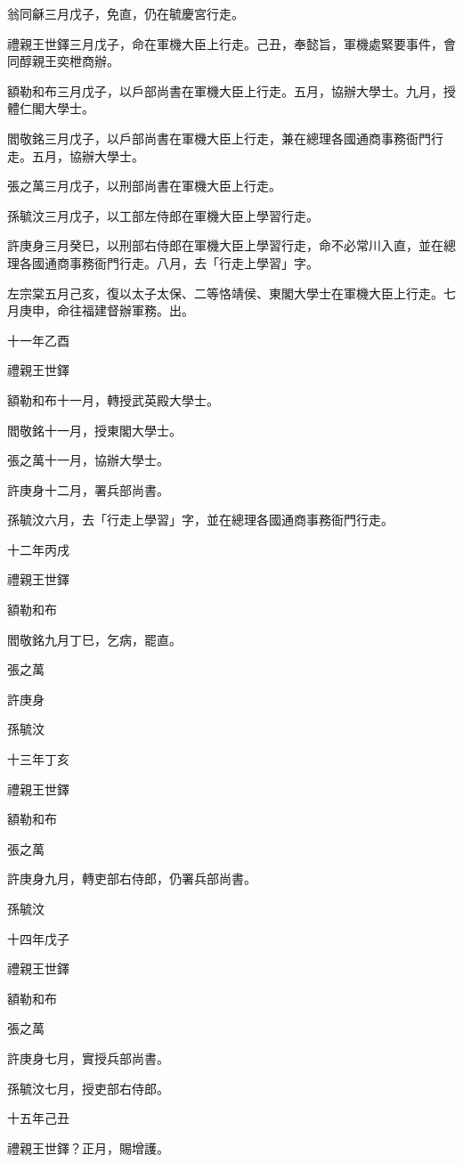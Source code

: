 \begin{pinyinscope}
翁同龢三月戊子，免直，仍在毓慶宮行走。

禮親王世鐸三月戊子，命在軍機大臣上行走。己丑，奉懿旨，軍機處緊要事件，會同醇親王奕枻商辦。

額勒和布三月戊子，以戶部尚書在軍機大臣上行走。五月，協辦大學士。九月，授體仁閣大學士。

閻敬銘三月戊子，以戶部尚書在軍機大臣上行走，兼在總理各國通商事務衙門行走。五月，協辦大學士。

張之萬三月戊子，以刑部尚書在軍機大臣上行走。

孫毓汶三月戊子，以工部左侍郎在軍機大臣上學習行走。

許庚身三月癸巳，以刑部右侍郎在軍機大臣上學習行走，命不必常川入直，並在總理各國通商事務衙門行走。八月，去「行走上學習」字。

左宗棠五月己亥，復以太子太保、二等恪靖侯、東閣大學士在軍機大臣上行走。七月庚申，命往福建督辦軍務。出。

十一年乙酉

禮親王世鐸

額勒和布十一月，轉授武英殿大學士。

閻敬銘十一月，授東閣大學士。

張之萬十一月，協辦大學士。

許庚身十二月，署兵部尚書。

孫毓汶六月，去「行走上學習」字，並在總理各國通商事務衙門行走。

十二年丙戌

禮親王世鐸

額勒和布

閻敬銘九月丁巳，乞病，罷直。

張之萬

許庚身

孫毓汶

十三年丁亥

禮親王世鐸

額勒和布

張之萬

許庚身九月，轉吏部右侍郎，仍署兵部尚書。

孫毓汶

十四年戊子

禮親王世鐸

額勒和布

張之萬

許庚身七月，實授兵部尚書。

孫毓汶七月，授吏部右侍郎。

十五年己丑

禮親王世鐸？正月，賜增護。


\end{pinyinscope}
